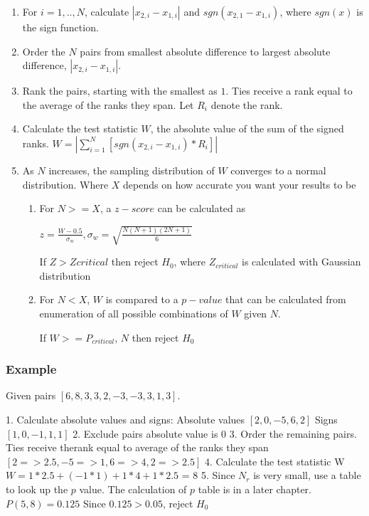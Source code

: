 \documentclass[12pt]{article}
\begin{document}
\begin{enumerate}
\item
For $i=1, .., N$, calculate $|x_{2,i} - x_{1,i}|$ and $sgn(x_{2,1} - x_{1,i})$, where $sgn(x)$ is the sign function.
\item
Order the $N$ pairs from smallest absolute difference to largest absolute difference, $|x_{2,i} - x_{1,i}|$.
\item
Rank the pairs, starting with the smallest as $1$. Ties receive a rank equal to the average of the ranks they span. Let $R_i$ denote the rank.
\item
Calculate the test statistic $W$, the absolute value of the sum of the signed ranks. $W=|\sum\limits_{i=1}^{N} [sgn(x_{2,i} - x_{1,i})*R_i]|$
\item
As $N$ increases, the sampling distribution of $W$ converges to a normal distribution. Where $X$ depends on how accurate you want your results to be
\begin{enumerate}
\item
For $N >= X$, a $z-score$ can be calculated as

$z=\frac{W-0.5}{\sigma_w},\sigma_w = \sqrt{\frac{N(N + 1)(2N + 1)}{6}}$

If $Z > Zcritical$ then reject $H_0$, where $Z_{critical}$ is calculated with Gaussian distribution

\item
For $N < X$, $W$  is compared to a $p-value$ that can be calculated from enumeration of all possible combinations of $W$ given $N$.

If $W >= P_{critical}$, $N$ then reject $H_0$
\end{enumerate}
\end{enumerate}

\subsubsection{Example}
Given pairs $[{6, 8}, {3, 3}, {2, -3}, {-3, 3}, {1, 3}]$.

1. Calculate absolute values and signs:
Absolute values $[2, 0, -5, 6, 2]$
Signs $[1, 0, -1, 1, 1]$
2. Exclude pairs absolute value is $0$
3. Order the remaining pairs. Ties receive therank equal to average of the ranks they span
$[{2 => 2.5}, {-5 => 1}, {6 => 4}, {2 => 2.5}]$
4. Calculate the test statistic W
$W = 1*2.5 + (-1*1) + 1*4 + 1*2.5$ = 8
5. Since $N_r$ is very small, use a table to look up the $p$ value. The calculation of $p$ table is in a later chapter.
$P(5, 8) = 0.125$
Since $0.125 > 0.05$, reject $H_0$
\end{document}
